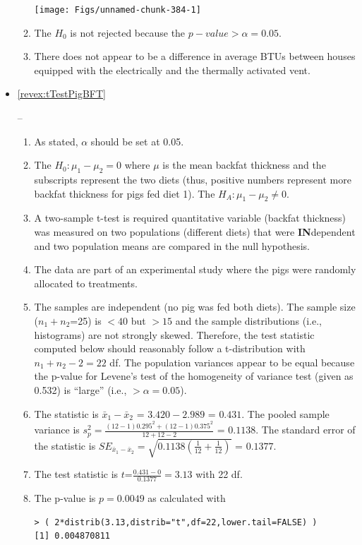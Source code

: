 \documentclass[10pt,openany]{book}\usepackage[]{graphicx}\usepackage[]{color}
\makeatletter
\newenvironment{kframe}{%
 \def\at@end@of@kframe{}%
 \ifinner\ifhmode%
  \def\at@end@of@kframe{\end{minipage}}%
  \begin{minipage}{\columnwidth}%
 \fi\fi%
 \def\FrameCommand##1{\hskip\@totalleftmargin \hskip-\fboxsep
 \colorbox{shadecolor}{##1}\hskip-\fboxsep
     \hskip-\linewidth \hskip-\@totalleftmargin \hskip\columnwidth}%
 \MakeFramed {\advance\hsize-\width
   \@totalleftmargin\z@ \linewidth\hsize
   \@setminipage}}%
 {\par\unskip\endMakeFramed%
 \at@end@of@kframe}
\newenvironment{knitrout}{}{} %
\makeatother
\begin{document}
\begin{itemize}
\begin{enumerate}
\begin{knitrout}
{\centering \texttt{[image: Figs/unnamed-chunk-384-1]} 

}



\end{knitrout}
      \item The $H_{0}$ is not rejected because the $p-value >\alpha=0.05$.
      \item There does not appear to be a difference in average BTUs between houses equipped with the electrically and the thermally activated vent.
    \end{enumerate}
  \item \hypertarget{ans:tTestPigBFT}{\ref{revex:tTestPigBFT}} --
    \begin{enumerate}
      \item As stated, $\alpha$ should be set at 0.05.
      \item The $H_{0}:\mu_{1}-\mu_{2}=0$ where $\mu$ is the mean backfat thickness and the subscripts represent the two diets (thus, positive numbers represent more backfat thickness for pigs fed diet 1).  The $H_{A}:\mu_{1}-\mu_{2}\neq0$.
      \item A two-sample t-test is required quantitative variable (backfat thickness) was measured on two populations (different diets) that were \textbf{IN}dependent and two population means are compared in the null hypothesis.
      \item The data are part of an experimental study where the pigs were randomly allocated to treatments.
      \item The samples are independent (no pig was fed both diets).  The sample size ($n_{1}+n_{2}$=25) is $<40$ but $>15$ and the sample distributions (i.e., histograms) are not strongly skewed.  Therefore, the test statistic computed below should reasonably follow a t-distribution with $n_{1}+n_{2}-2=22$ df.  The population variances appear to be equal because the p-value for Levene's test of the homogeneity of variance test (given as 0.532) is ``large'' (i.e., $>\alpha=0.05$).
      \item The statistic is $\bar{x}_{1}-\bar{x}_{2}$ = $3.420-2.989$ = $0.431$.  The pooled sample variance is $s_{p}^{2}=\frac{(12-1)0.295^{2}+(12-1)0.375^{2}}{12+12-2}$ = $0.1138$.  The standard error of the statistic is $SE_{\bar{x}_{1}-\bar{x}_{2}}=\sqrt{0.1138\left(\frac{1}{12}+\frac{1}{12} \right)}$ = $0.1377$.
      \item The test statistic is $t$=$\frac{0.431-0}{0.1377} = 3.13$ with 22 df.
      \item The p-value is $p=0.0049$ as calculated with
\begin{knitrout}
\color{fgcolor}\begin{kframe}
\begin{verbatim}
> ( 2*distrib(3.13,distrib="t",df=22,lower.tail=FALSE) )
[1] 0.004870811
\end{verbatim}
\end{kframe}


\end{knitrout}
\end{enumerate}
\end{itemize}
\end{document}
